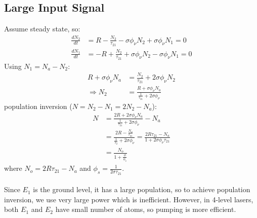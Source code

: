 \documentclass[11pt]{article}
\begin{document}
\subsection{Large Input Signal}
Assume steady state, so:
\begin{align*}
    \frac{dN_2}{dt} &= R - \frac{N_2}{\tau_{21}} - \sigma \phi_{\nu} N_2 + \sigma \phi_{\nu} N_1 = 0\\
    \frac{dN_1}{dt} &= - R + \frac{N_2}{\tau_{21}} + \sigma \phi_{\nu} N_2 - \sigma \phi_{\nu} N_1 = 0
\end{align*}
Using $N_1 = N_a - N_2$:
\begin{align*}
    R + \sigma \phi_{\nu} N_a &= \frac{N_2}{\tau_{21}} + 2\sigma \phi_{\nu} N_2\\
    \Rightarrow N_2 &= \frac{R + \sigma \phi_{\nu} N_a}{\frac{1}{\tau_{21}} + 2\sigma \phi_{\nu}}
\end{align*}
population inversion ($N = N_2 - N_1 = 2N_2 - N_a$):
\begin{align*}
    N &= \frac{2R + 2\sigma \phi_{\nu} N_a}{\frac{1}{\tau_{21}} + 2\sigma \phi_{\nu}} - N_a\\
    &= \frac{2R - \frac{N_a}{\tau_{21}}}{\frac{1}{\tau_{2}} + 2\sigma \phi_{\nu}} = \frac{2R \tau_{21} - N_a}{1 + 2\sigma \phi_{\nu} \tau_{21}} \\
    &= \frac{N_o}{1 + \frac{\phi}{\phi_s}}
\end{align*}
where $N_o = 2R \tau_{21} - N_a$ and $\phi_s = \frac{1}{2\sigma \tau_{21}}$. \\ \\
Since $E_1$ is the ground level, it has a large population, so to achieve population inversion, we use very large power which is inefficient. However, in 4-level lasers, both $E_1$ and $E_2$ have small number of atoms, so pumping is more efficient.
\end{document}

